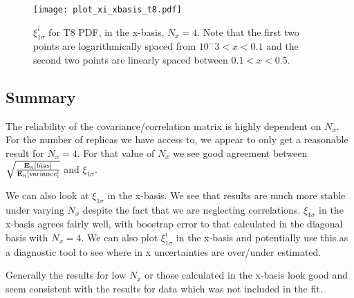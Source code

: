 \begin{figure}
    \centering
    \texttt{[image: plot\_xi\_xbasis\_t8.pdf]}
    \caption{
        $\xi^{i}_{1\sigma}$ for T8 PDF, in the x-basis, $N_x=4$. Note that
        the first two points are logarithmically spaced from $10^-3 < x < 0.1$
        and the second two points are linearly spaced between $0.1 < x < 0.5$.
    }
    \label{fig:pdfxit8}
\end{figure}

\subsection{Summary}

The reliability of the covariance/correlation matrix is highly dependent on
$N_x$. For the number of replicas we have access to, we appear to only get a
reasonable result for $N_x=4$. For that value of $N_x$ we see good agreement
between $\sqrt{\frac{\mathbf{E}_{\eta}\left[ {\rm bias} \right]}{\mathbf{E}_{\eta}\left[ {\rm variance} \right]}}$ and $\xi_{1\sigma}$.

We can also look at $\xi_{1\sigma}$ in the x-basis. We see that results are
much more stable under varying $N_x$ despite the fact that we are neglecting
correlations. $\xi_{1\sigma}$ in the x-basis agrees fairly well, with boostrap
error to that calculated in the diagonal basis with $N_x=4$. We can also
plot $\xi_{1\sigma}^i$ in the x-basis and potentially use this as a diagnostic
tool to see where in x uncertainties are over/under estimated.

Generally the results for low $N_x$ or those calculated in the x-basis look good
and seem consistent with the results for data which was not included in the fit.

